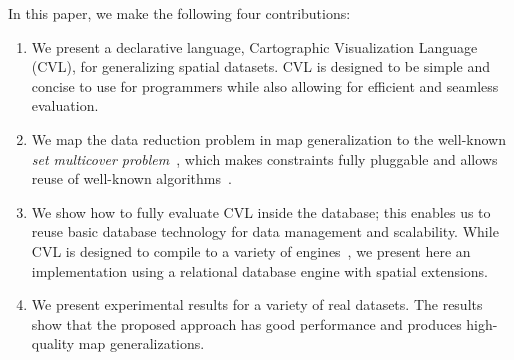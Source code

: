 %

In this paper, we make the following four contributions:
\begin{enumerate}
\item We present a declarative language, Cartographic Visualization Language (CVL), for generalizing spatial datasets. CVL is designed to be simple and concise to use for programmers while also allowing for efficient and seamless evaluation.

\item We map the data reduction problem in map generalization to the well-known \emph{set multicover problem}~\cite{rajagopalan1998primal}, which makes constraints fully pluggable and allows reuse of well-known algorithms~\cite{rajagopalan1998primal,vazirani2001approximation}.

\item We show how to fully evaluate CVL inside the database; this enables us to reuse basic database technology for data management and scalability. While CVL is designed to compile to a variety of engines~\cite{dean04mapreduce}, we present here an implementation using a relational database engine with spatial extensions.

\item We present experimental results for a variety of real datasets. The results show that the proposed approach has good performance and produces high-quality map generalizations.
\end{enumerate}

